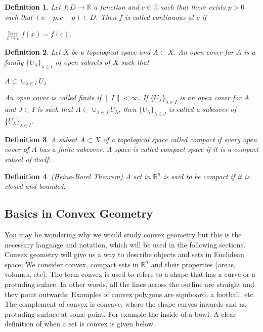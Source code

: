 \documentclass[a4paper]{book}
\newtheorem{definition}{Definition}%
\begin{document}
\begin{definition}
	Let $f:D\to\mathbb{R}$ a function and $c\in\mathbb{R}$ such that there exists $p>0$ such that $(c-p,c+p)\in D$. Then $f$ is called \textit{continuous} at $c$ if
	\begin{center}
		$\underset{x\to c}{\lim}f(x)=f(c)$.
	\end{center}
\end{definition}

\begin{definition}
    Let $X$ be a topological space and $A \subset X$. An open cover for $A$ is a family $\{U_\lambda\}_{\lambda\in I}$ of open subsets of $X$ such that
    \begin{center}
        $A \subset \cup_{\lambda\in I}{U_\lambda}$
    \end{center}
    An open cover is called finite if $\|I\|<\infty$. If $\{U_\lambda\}_{\lambda\in I}$ is an open cover for $A$ and $J \subset I$ is such that $A\subset\cup_{\lambda\in J}{U_\lambda}$, then $\{U_\lambda\}_{\lambda\in J}$ is called a subcover of $\{U_\lambda\}_{\lambda\in I}$.
\end{definition}

\begin{definition}
    A subset $A \subset X$ of a topological space called compact if every open cover of $A$ has a finite subcover. A space is called compact space if it is a compact subset of itself.
\end{definition}

\begin{definition} (Heine-Borel Theorem)
    A set in $\mathbb{R}^n$ is said to be compact if it is closed and bounded.
\end{definition}

\newpage
\subsection{Basics in Convex Geometry}
You may be wondering why we would study convex geometry but this is the necessary language and notation, which will be used in the following sections. Convex geometry will give us a way to describe objects and sets in Euclidean space; We consider convex, compact sets in $\mathbb{R}^n$ and their properties (areas, volumes, etc). The term convex is used to refere to a shape that has a curve or a protuding suface. In other words, all the lines across the outline are straight and they point outwards. Examples of convex polygons are signboard, a football, etc. The complement of convex is concave, where the shape curves inwards and no protuding surface at some point. For example the inside of a bowl. A clear definition of when a set is convex is given below. 
\end{document}
